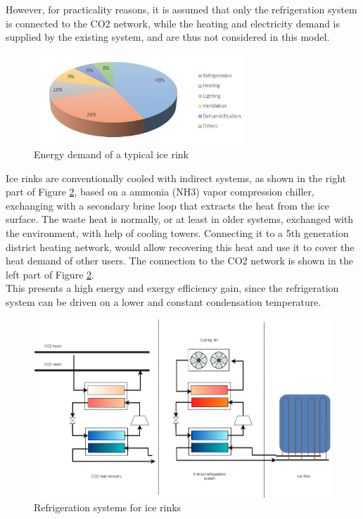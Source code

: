 \documentclass{article}
\begin{document}
However, for practicality reasons, it is assumed that only the refrigeration system is connected to the CO2 network, while the heating and electricity demand is supplied by the existing system, and are thus not considered in this model.

\begin{figure}[htp]
	\centering
	\includegraphics[width=0.7\textwidth]{IR_energyDemand.JPG}
	\caption{Energy demand of a typical ice rink \cite{karampourMEASUREMENTMODELLINGICE}}
	\label{fig:IR_energyDemand}
\end{figure}

Ice rinks are conventionally cooled with indirect systems, as shown in the right part of Figure \ref{fig:IR_refSystem}, based on a ammonia (NH3) vapor compression chiller, exchanging with a secondary brine loop that extracts the heat from the ice surface. The waste heat is normally, or at least in older systems, exchanged with the environment, with help of cooling towers. Connecting it to a 5th generation district heating network, would allow recovering this heat and use it to cover the heat demand of other users. The connection to the CO2 network is shown in the left part of Figure \ref{fig:IR_refSystem}.\\

This presents a high energy and exergy efficiency gain, since the refrigeration system can be driven on a lower and constant condensation temperature.

\begin{figure}[htp]
	\centering
	\includegraphics[width=1\textwidth]{IceRink_refrigeration.png}
	\caption{Refrigeration systems for ice rinks}
	\label{fig:IR_refSystem}
\end{figure}
\end{document}
